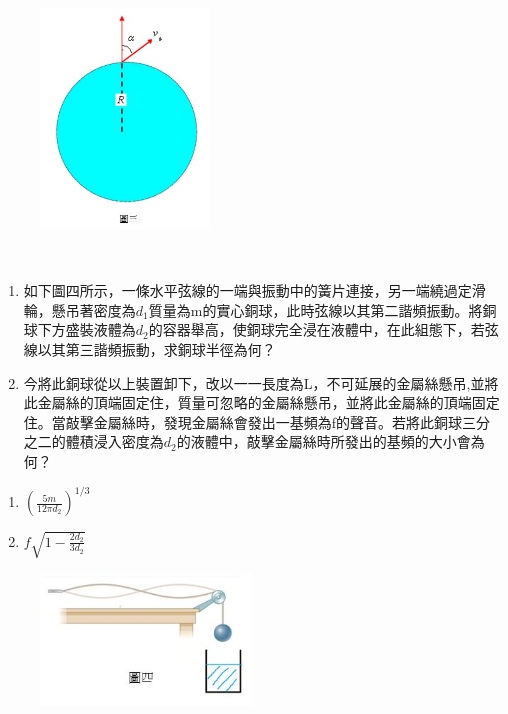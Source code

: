 \documentclass[cn,10pt,math=newtx,chinesefont=founder]{elegantbook}
\begin{document}
\begin{figure}[htbp]
\flushright
\includegraphics[width=0.4\textwidth]{image/3.JPG}
\end{figure}

\newpage


\begin{example}　
    \begin{enumerate}[label=(\arabic*)]
    \item 如下圖四所示，一條水平弦線的一端與振動中的簧片連接，另一端繞過定滑輪，懸吊著密度為$d_1$質量為m的實心銅球，此時弦線以其第二諧頻振動。將銅球下方盛裝液體為$d_2$的容器舉高，使銅球完全浸在液體中，在此組態下，若弦線以其第三諧頻振動，求銅球半徑為何？ 
    \item 今將此銅球從以上裝置卸下，改以一一長度為L，不可延展的金屬絲懸吊,並將此金屬絲的頂端固定住，質量可忽略的金屬絲懸吊，並將此金屬絲的頂端固定住。當敲擊金屬絲時，發現金屬絲會發出一基頻為f的聲音。若將此銅球三分之二的體積浸入密度為$d_2$的液體中，敲擊金屬絲時所發出的基頻的大小會為何？
    \end{enumerate}
    
    \rightline{[4]}
\end{example}

\begin{solution}
\begin{enumerate}[label=(\arabic*)]
\item $(\frac{5m}{12\pi d_2})^{1/3}$
\item $f\sqrt{1-\frac{2d_2}{3d_2}}$
\end{enumerate}
\end{solution}

\begin{figure}[htbp]
\flushright
\includegraphics[width=0.5\textwidth]{image/4.JPG}
\end{figure}
\end{document}
